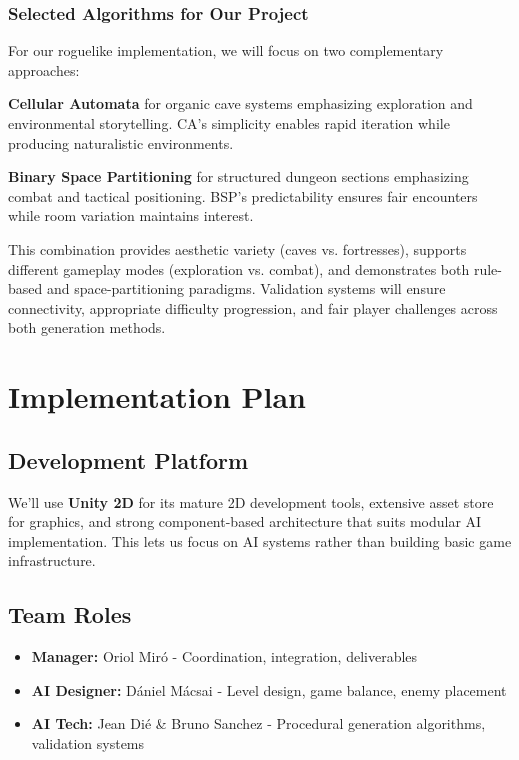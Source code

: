\documentclass[11pt]{article}
\begin{document}
\subsubsection{Selected Algorithms for Our Project}

For our roguelike implementation, we will focus on two complementary approaches:

\textbf{Cellular Automata} for organic cave systems emphasizing exploration and environmental storytelling. CA's simplicity enables rapid iteration while producing naturalistic environments.

\textbf{Binary Space Partitioning} for structured dungeon sections emphasizing combat and tactical positioning. BSP's predictability ensures fair encounters while room variation maintains interest.

This combination provides aesthetic variety (caves vs. fortresses), supports different gameplay modes (exploration vs. combat), and demonstrates both rule-based and space-partitioning paradigms. Validation systems will ensure connectivity, appropriate difficulty progression, and fair player challenges across both generation methods.

\section{Implementation Plan}
\label{sec:technical}

\subsection{Development Platform}

We'll use \textbf{Unity 2D} for its mature 2D development tools, extensive asset store for graphics, and strong component-based architecture that suits modular AI implementation. This lets us focus on AI systems rather than building basic game infrastructure.

\subsection{Team Roles}
\begin{itemize}
    \item \textbf{Manager:} Oriol Miró - Coordination, integration, deliverables
    \item \textbf{AI Designer:} Dániel Mácsai - Level design, game balance, enemy placement
    \item \textbf{AI Tech:} Jean Dié \& Bruno Sanchez - Procedural generation algorithms, validation systems
\end{itemize}







\end{document}
